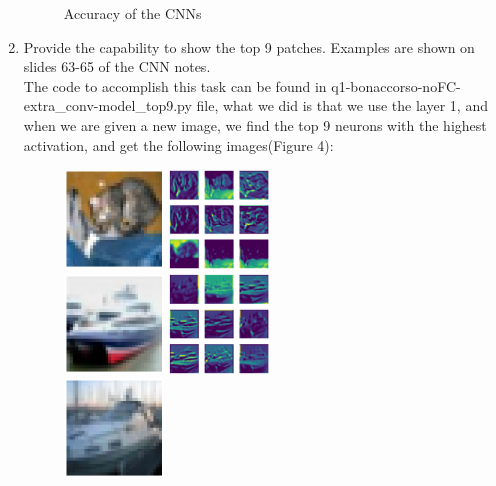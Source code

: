 \documentclass[11pt]{article}
\begin{document}
\begin{enumerate}
\begin{figure}[h!]
        \caption{Accuracy of the CNNs}
\end{figure}
\item Provide the capability to show the top 9 patches. Examples are shown on slides 63-65 of the CNN notes.\\
The code to accomplish this task can be found in q1-bonaccorso-noFC-extra\_conv-model\_top9.py file, what we did is that we use the layer 1, and when we are given a new image, we find the top 9 neurons with the highest activation, and get the following images(Figure 4):
\begin{figure}[h!]
    \centering
     \includegraphics[width=0.25\textwidth]{images/0_input_image}
     \includegraphics[width=0.25\textwidth]{images/0_top_layers}\\
     \includegraphics[width=0.25\textwidth]{images/1_input_image}
     \includegraphics[width=0.25\textwidth]{images/1_top_layers}\\
     \includegraphics[width=0.25\textwidth]{images/2_input_image}

\end{figure}
\end{enumerate}
\end{document}
